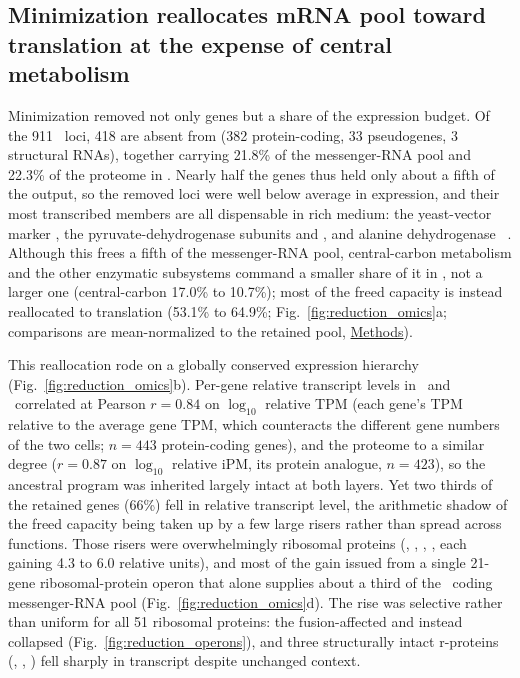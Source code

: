 \subsection{Minimization reallocates mRNA pool toward translation at the expense of central metabolism}

Minimization removed not only genes but a share of the expression budget.
Of the 911 \syn~loci, 418 are absent from \syna (382 protein-coding, 33 pseudogenes, 3 structural RNAs), together carrying 21.8\% of the messenger-RNA pool and 22.3\% of the proteome in \syn.
Nearly half the genes thus held only about a fifth of the output, so the removed loci were well below average in expression, and their most transcribed members are all dispensable in rich medium: the yeast-vector marker , the pyruvate-dehydrogenase subunits  and , and alanine dehydrogenase ~\cite{breuer_essential_2019}.
Although this frees a fifth of the messenger-RNA pool, central-carbon metabolism and the other enzymatic subsystems command a smaller share of it in \syna, not a larger one (central-carbon 17.0\% to 10.7\%); most of the freed capacity is instead reallocated to translation (53.1\% to 64.9\%; Fig.~\ref{fig:reduction_omics}a; comparisons are mean-normalized to the retained pool, \hyperref[method:reduction-normalization]{Methods}).

This reallocation rode on a globally conserved expression hierarchy (Fig.~\ref{fig:reduction_omics}b).
Per-gene relative transcript levels in \syn~and \syna~correlated at Pearson $r = 0.84$ on $\log_{10}$ relative TPM (each gene's TPM relative to the average gene TPM, which counteracts the different gene numbers of the two cells; $n = 443$ protein-coding genes), and the proteome to a similar degree ($r = 0.87$ on $\log_{10}$ relative iPM, its protein analogue, $n = 423$), so the ancestral program was inherited largely intact at both layers.
Yet two thirds of the retained genes (66\%) fell in relative transcript level, the arithmetic shadow of the freed capacity being taken up by a few large risers rather than spread across functions.
Those risers were overwhelmingly ribosomal proteins (, , , , each gaining 4.3 to 6.0 relative units), and most of the gain issued from a single 21-gene ribosomal-protein operon that alone supplies about a third of the \syna~coding messenger-RNA pool (Fig.~\ref{fig:reduction_omics}d).
The rise was selective rather than uniform for all 51 ribosomal proteins: the fusion-affected  and  instead collapsed (Fig.~\ref{fig:reduction_operons}), and three structurally intact r-proteins (, , ) fell sharply in transcript despite unchanged context.

